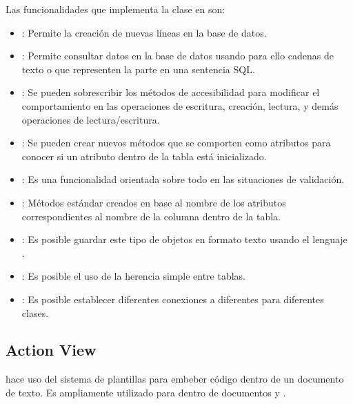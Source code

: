 Las funcionalidades que implementa la clase  en
 son:

\begin{itemize}
\item {}: Permite la creación de nuevas líneas en la base de
  datos.
\item {}: Permite consultar datos en la base de datos usando
  para ello cadenas de texto o  que representen la parte
   en una sentencia SQL.
\item {}: Se pueden
  sobrescribir los métodos de accesibilidad para modificar el comportamiento en
  las operaciones de escritura, creación, lectura, y demás operaciones de
  lectura/escritura.
\item {}: Se pueden crear nuevos
  métodos que se comporten como atributos para conocer si un atributo dentro de
  la tabla está inicializado.
\item {}: Es una funcionalidad orientada sobre todo en las
  situaciones de validación.
\item {}: Métodos estándar
  creados en base al nombre de los atributos correspondientes al nombre de la
  columna dentro de la tabla.
\item {}: Es posible guardar este tipo de objetos en formato texto usando el
  lenguaje .
\item {}: Es posible el uso de la herencia
  simple entre tablas.
\item {}: Es
  posible establecer diferentes conexiones a diferentes  para
  diferentes clases.
\end{itemize}

\subsection{Action View}
 hace uso del sistema de plantillas  para
embeber código  dentro de un documento de texto. Es ampliamente
utilizado para dentro de documentos  y .

